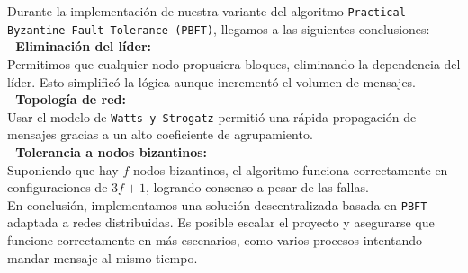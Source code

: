 \large{
Durante la implementación de nuestra variante del algoritmo \texttt{Practical Byzantine Fault Tolerance (PBFT)}, llegamos a las siguientes conclusiones:\\

- \textbf{Eliminación del líder:}\\ 
   Permitimos que cualquier nodo propusiera bloques, eliminando la dependencia del líder. Esto simplificó la lógica aunque incrementó el volumen de mensajes.\\

- \textbf{Topología de red:} \\
   Usar el modelo de \texttt{Watts y Strogatz} permitió una rápida propagación de mensajes gracias a un alto coeficiente de agrupamiento. \\

- \textbf{Tolerancia a nodos bizantinos:}\\
   Suponiendo que hay \(f\) nodos bizantinos, el algoritmo funciona correctamente en configuraciones de \(3f + 1\), logrando consenso a pesar de las fallas. \\

En conclusión, implementamos una solución descentralizada basada en \texttt{PBFT} adaptada a redes distribuidas. Es posible escalar el proyecto y asegurarse que funcione correctamente en más escenarios, como varios procesos intentando mandar mensaje al mismo tiempo. 
}
